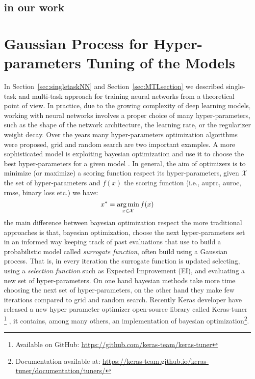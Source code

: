 \subsection{in our work}

\section{Gaussian Process for Hyper-parameters Tuning of the Models}
In Section~\ref{sec:singletaskNN} and Section~\ref{sec:MTLsection} we
described single-task and multi-task approach for training neural
networks from a theoretical point of view. In practice, due to the
growing complexity of deep learning models, working with neural networks
involves a proper choice of many hyper-parameters, such as the shape of
the network architecture, the learning rate, or the regularizer weight
decay. Over the years many hyper-parameters optimization algorithms were
proposed, grid and random search \cite{BergstraB12} are two important
examples. A more sophisticated model is exploiting bayesian optimization
and use it to choose the best hyper-parameters for a given model
\cite{SnoekGP}. In general, the aim of optimizers is to minimize (or
maximize) a scoring function respect its hyper-parameters, given
$\mathcal{X}$ the set of hyper-parameters and $f(x)$ the scoring function
(i.e., auprc, auroc, rmse, binary loss etc.) we have: 
\[ 
x^* =  \operatorname*{arg\,min}_{x \in \mathcal{X}} f(x) 
\]
the main difference between bayesian optimization respect the more
traditional approaches is that, bayesian optimization, choose the next
hyper-parameters set in an informed way keeping track of past evaluations
that use to build a probabilistic model called \emph{surrogate function}, often build using a Gaussian process. That is, in every
iteration the surrogate function is updated selecting, using a
\emph{selection function} such as Expected Improvement (EI), and
evaluating a new set of hyper-parameters. On one hand bayesian methods
take more time choosing the next set of hyper-parameters, on the other
hand they make few iterations compared to grid and random search. 
Recently Keras developer have released a new hyper parameter optimizer
open-source library called Keras-tuner \footnote{Available on GitHub:
\url{https://github.com/keras-team/keras-tuner}}
\cite{omalley2019kerastuner}, it contains, among many others, an
implementation of bayesian optimization\footnote{Documentation available
at: \url{https://keras-team.github.io/keras-tuner/documentation/tuners/}}.

